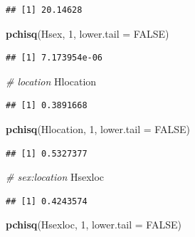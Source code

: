 \documentclass[12pt,]{book}
\newenvironment{Shaded}{\begin{snugshade}}{\end{snugshade}}
\newcommand{\CommentTok}[1]{\textcolor[rgb]{0.37,0.37,0.37}{\textit{#1}}}
\newcommand{\DataTypeTok}[1]{\textcolor[rgb]{0.27,0.27,0.27}{#1}}
\newcommand{\DecValTok}[1]{\textcolor[rgb]{0.06,0.06,0.06}{#1}}
\newcommand{\KeywordTok}[1]{\textcolor[rgb]{0.27,0.27,0.27}{\textbf{#1}}}
\newcommand{\NormalTok}[1]{#1}
\newcommand{\OtherTok}[1]{\textcolor[rgb]{0.37,0.37,0.37}{#1}}
\begin{document}
\begin{verbatim}
## [1] 20.14628
\end{verbatim}

\begin{Shaded}
\begin{Highlighting}[]
\KeywordTok{pchisq}\NormalTok{(Hsex, }\DecValTok{1}\NormalTok{, }\DataTypeTok{lower.tail =} \OtherTok{FALSE}\NormalTok{)}
\end{Highlighting}
\end{Shaded}

\begin{verbatim}
## [1] 7.173954e-06
\end{verbatim}

\begin{Shaded}
\begin{Highlighting}[]
\CommentTok{# location}
\NormalTok{Hlocation}
\end{Highlighting}
\end{Shaded}

\begin{verbatim}
## [1] 0.3891668
\end{verbatim}

\begin{Shaded}
\begin{Highlighting}[]
\KeywordTok{pchisq}\NormalTok{(Hlocation, }\DecValTok{1}\NormalTok{, }\DataTypeTok{lower.tail =} \OtherTok{FALSE}\NormalTok{)}
\end{Highlighting}
\end{Shaded}

\begin{verbatim}
## [1] 0.5327377
\end{verbatim}

\begin{Shaded}
\begin{Highlighting}[]
\CommentTok{# sex:location}
\NormalTok{Hsexloc}
\end{Highlighting}
\end{Shaded}

\begin{verbatim}
## [1] 0.4243574
\end{verbatim}

\begin{Shaded}
\begin{Highlighting}[]
\KeywordTok{pchisq}\NormalTok{(Hsexloc, }\DecValTok{1}\NormalTok{, }\DataTypeTok{lower.tail =} \OtherTok{FALSE}\NormalTok{)}
\end{Highlighting}
\end{Shaded}
\end{document}
